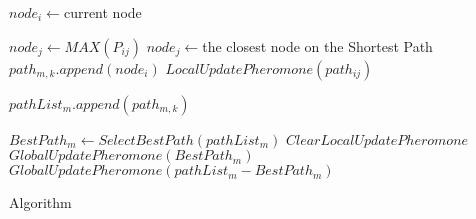 \documentclass{article}
\begin{document}
\begin{algorithm}[H]
	{		
		{
			$node_{i} \gets $current node\;
			{
				{
					$node_{j} \gets MAX(P_{ij})$\;
				}
				{
					$node_{j} \gets $the closest node on the Shortest Path\;
				}
				$path_{m, k}.append(node_{i})$\;
				$LocalUpdatePheromone(path_{ij})$\;
				
			}
			\;
			$pathList_{m}.append(path_{m, k})$\;
				
		}
		\;
		$BestPath_{m} \gets SelectBestPath(pathList_{m})$\;
		$ClearLocalUpdatePheromone$\;
		$GlobalUpdatePheromone(BestPath_{m})$\;
		$GlobalUpdatePheromone(pathList_{m}-BestPath_{m})$\;
	}
\caption{Algorithm}
\end{algorithm}
\end{document}
